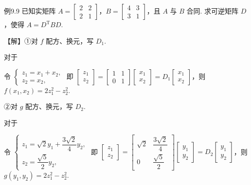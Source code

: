 \begin{fcard}{例9.9}
已知实矩阵 $A=\begin{bmatrix}2&2\\2&1\end{bmatrix}$，$B=\begin{bmatrix}4&3\\3&1\end{bmatrix}$，且 $A$ 与 $B$ 合同. 求可逆矩阵 $D$，使得 $A=D^{\mathrm T}BD$.


【解】①对 $f$ 配方、换元，写 $D_1$.

对于


令 $\begin{cases}z_1=x_1+x_2,\\[2pt]z_2=x_2,\end{cases}$ 即 $\begin{bmatrix}z_1\\z_2\end{bmatrix}=\begin{bmatrix}1&1\\0&1\end{bmatrix}\begin{bmatrix}x_1\\x_2\end{bmatrix}=D_1\begin{bmatrix}x_1\\x_2\end{bmatrix}$，则 $f(x_1,x_2)=2z_1^2-z_2^2$.

②对 $g$ 配方、换元，写 $D_2$.

对于


令 $\begin{cases}z_1=\sqrt2y_1+\dfrac{3\sqrt2}{4}y_2,\\[8pt]z_2=\dfrac{\sqrt5}{2}y_2,\end{cases}$ 即 $\begin{bmatrix}z_1\\z_2\end{bmatrix}=\begin{bmatrix}\sqrt2&\dfrac{3\sqrt2}{4}\\[8pt]0&\dfrac{\sqrt5}{2}\end{bmatrix}\begin{bmatrix}y_1\\y_2\end{bmatrix}=D_2\begin{bmatrix}y_1\\y_2\end{bmatrix}$，则 $g(y_1,y_2)=2z_1^2-z_2^2$.


\end{fcard}
